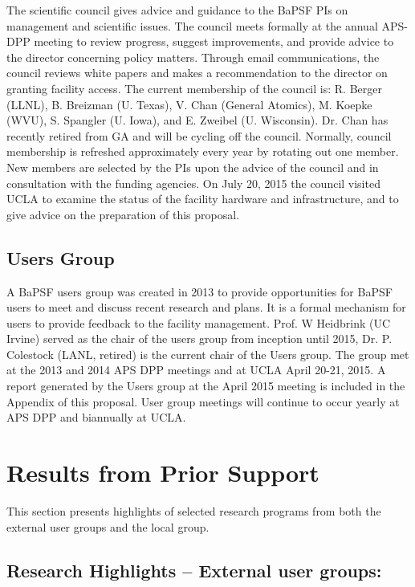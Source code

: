 \documentclass[11pt]{article}
\begin{document}
The scientific council gives advice and guidance to the BaPSF PIs on
management and scientific issues. The council meets formally at the
annual APS-DPP meeting to review progress, suggest improvements, and
provide advice to the director concerning policy matters. Through email
communications, the council reviews white papers and makes a
recommendation to the director on granting facility access. The current
membership of the council is: R. Berger (LLNL), B. Breizman (U. Texas),
V. Chan (General Atomics), M. Koepke (WVU), S. Spangler (U. Iowa), and
E. Zweibel (U. Wisconsin). Dr. Chan has recently retired from GA and
will be cycling off the council. Normally, council membership is
refreshed approximately every year by rotating out one member. New
members are selected by the PIs upon the advice of the council and in
consultation with the funding agencies. On July 20, 2015 the council
visited UCLA to examine the status of the facility hardware and
infrastructure, and to give advice on the preparation of this proposal.


\subsection{Users Group}

A BaPSF users group was created in 2013 to provide opportunities for
BaPSF users to meet and discuss recent research and plans.  It is a formal
mechanism for users to provide feedback to the facility
management. Prof. W Heidbrink (UC Irvine) served as the chair of the
users group from inception until 2015, Dr. P. Colestock (LANL,
retired) is the current chair of the Users group.  The group met at
the 2013 and 2014 APS DPP meetings and at UCLA April 20-21, 2015.  A
report generated by the Users group at the April 2015 meeting is
included in the Appendix of this proposal. User group meetings will
continue to occur yearly at APS DPP and biannually at UCLA.


\section{Results from Prior Support}

This section presents highlights of selected research programs from
both the external user groups and the local group.   

\subsection{Research Highlights -- External user groups:}
\end{document}
